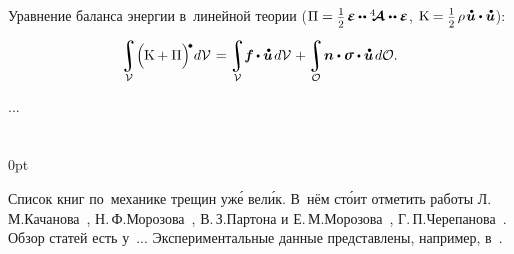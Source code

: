 \begin{otherlanguage}{russian}

Уравнение баланса энергии в~линейной теории (${\potential = \smash{\smalldisplaystyleonehalf} \hspace{.25ex} \infinitesimaldeformation \hspace{-0.1ex} \dotdotp \stiffnesstensor \dotdotp \infinitesimaldeformation}$, ${\kinetic = \smash{\smalldisplaystyleonehalf} \hspace{.25ex} \rho \hspace{.2ex} \mathdotabove{\bm{u}} \dotp \mathdotabove{\bm{u}}}$):

\nopagebreak\vspace{-0.1em}\begin{equation}
\integral\displaylimits_{\mathcal{V}} \hspace{-0.42ex} \left(^{\mathstrut} \hspace{-0.2ex} \kinetic + \potential \right)^{\hspace{-0.12em}\tikz[baseline=-0.2ex] \draw[black, fill=black] (0,0) circle (.28ex);} \hspace{-0.25ex} d\mathcal{V} \hspace{.2ex}
= \hspace{-0.1ex}
\integral\displaylimits_{\mathcal{V}} \hspace{-0.5ex} \bm{f} \hspace{-0.1ex} \dotp \mathdotabove{\bm{u}} \hspace{.25ex} d\mathcal{V} \hspace{.16ex}
+ \hspace{-0.1ex}
\integral\displaylimits_{\mathcal{O}} \hspace{-0.32ex} \bm{n} \dotp \linearstress \dotp \mathdotabove{\bm{u}} \hspace{.25ex} d\mathcal{O} .
\end{equation}

...



\end{otherlanguage}

\section*{\small \wordforbibliography}

\begin{changemargin}{\parindent}{0pt}
\fontsize{10}{12}\selectfont

\begin{otherlanguage}{russian}

Список книг по~механике трещин уж\'{е} вел\'{и}к. В~нём ст\'{о}ит отметить работы Л.\,М.\;Качанова~\cite{kachanov-fracturemechanics}, Н.\,Ф.\;Морозова~\cite{morozov-fractures}, В.\,З.\;Партона и Е.\,М.\;Морозова~\cite{parton.morozov-destructionofelastoplastic}, Г.\,П.\;Черепанова~\cite{cherepanov-fragilefracture}. Обзор статей есть у~... Экспериментальные данные представлены, например, в~\cite{kerstein.klyushnikov.lomakin.shesterikov-experimentalfracturemechanics}.

\end{otherlanguage}

\end{changemargin}
